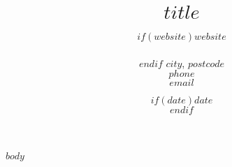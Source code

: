 \documentclass[11pt, a4paper]{article}
\title{$title$} %
\date{$if(date)$$date$\\$endif$} %
\author{$if(website)$$website$\\\\$endif$
$city$, $postcode$\\ %
$phone$ \\ $email$ } %
\begin{document}
\maketitle
\begin{raggedright}
	\justify
$body$
\end{raggedright}
\end{document}
